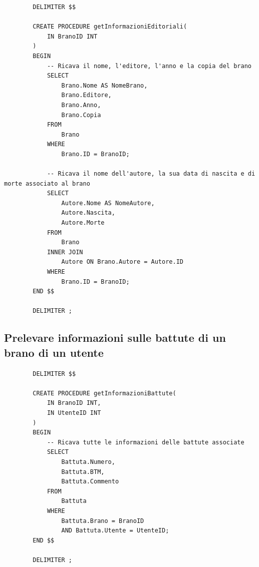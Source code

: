 \documentclass{article}
\begin{document}
    \begin{verbatim}
        DELIMITER $$

        CREATE PROCEDURE getInformazioniEditoriali(
            IN BranoID INT
        )
        BEGIN
            -- Ricava il nome, l'editore, l'anno e la copia del brano
            SELECT
                Brano.Nome AS NomeBrano,
                Brano.Editore,
                Brano.Anno,
                Brano.Copia
            FROM
                Brano
            WHERE
                Brano.ID = BranoID;

            -- Ricava il nome dell'autore, la sua data di nascita e di morte associato al brano
            SELECT
                Autore.Nome AS NomeAutore,
                Autore.Nascita,
                Autore.Morte
            FROM
                Brano
            INNER JOIN
                Autore ON Brano.Autore = Autore.ID
            WHERE
                Brano.ID = BranoID;
        END $$

        DELIMITER ;
    \end{verbatim}
    
    \subsection{Prelevare informazioni sulle battute di un brano di un utente}
    
    \begin{verbatim}
        DELIMITER $$

        CREATE PROCEDURE getInformazioniBattute(
            IN BranoID INT,
            IN UtenteID INT
        )
        BEGIN
            -- Ricava tutte le informazioni delle battute associate
            SELECT
                Battuta.Numero,
                Battuta.BTM,
                Battuta.Commento
            FROM
                Battuta
            WHERE
                Battuta.Brano = BranoID
                AND Battuta.Utente = UtenteID;
        END $$

        DELIMITER ;
    \end{verbatim}
\end{document}
